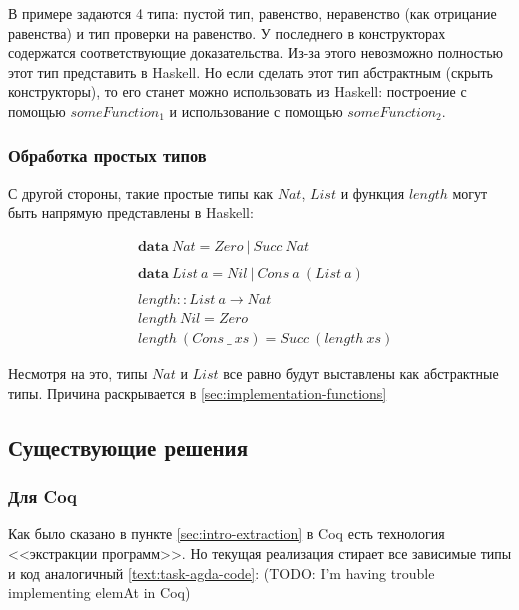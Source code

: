 В примере задаются 4 типа: пустой тип, равенство, неравенство
(как отрицание равенства) и тип проверки на равенство. У последнего
в конструкторах содержатся соответствующие доказательства. Из-за этого
невозможно полностью этот тип представить в Haskell. Но если сделать этот
тип абстрактным (скрыть конструкторы), то его станет можно использовать из
Haskell: построение с помощью \(someFunction_1\) и использование с помощью
\(someFunction_2\).

\subsubsection{Обработка простых типов}

С другой стороны, такие простые типы как \(Nat\), \(List\) и
функция \(length\) могут быть напрямую представлены в Haskell:

\begin{align*}
&\mathbf{data}\ Nat = Zero\ |\ Succ\ Nat\\
\\
&\mathbf{data}\ List\ a = Nil\ |\ Cons\ a\ (List\ a)\\
\\
&length :: List\ a \rightarrow Nat\\
&length\ Nil = Zero\\
&length\ (Cons\ \_\ xs) = Succ\ (length\ xs)
\end{align*}

Несмотря на это, типы \(Nat\) и \(List\) все равно будут выставлены
как абстрактные типы. Причина раскрывается в \ref{sec:implementation-functions}

\subsection{Существующие решения}

\subsubsection{Для Coq}

Как было сказано в пункте \ref{sec:intro-extraction} в Coq есть технология
<<экстракции программ>>. Но текущая реализация стирает все зависимые типы и
код аналогичный \ref{text:task-agda-code}:
(TODO: I'm having trouble implementing elemAt in Coq)

